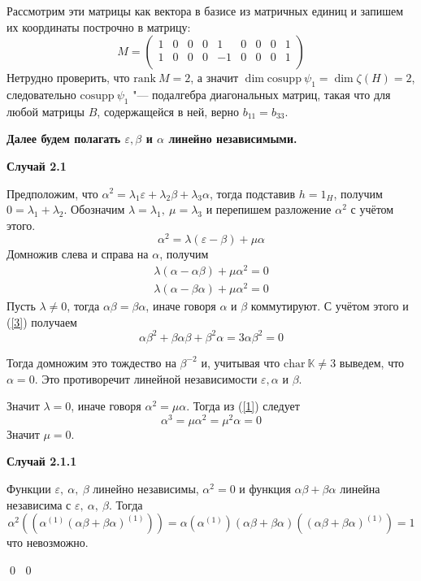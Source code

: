 \documentclass[12pt, reqno, a4paper, oneside, notitlepage]{amsart}
\makeatletter
\theoremstyle{mytheoremstyle}
\theoremstyle{myremarkstyle}
\numberwithin{equation}{section}
\renewenvironment{proof}[1][\proofname]{\par\indent {\bfseries #1\@addpunct{.} }}{\qed}
\makeatother
\begin{document}
\begin{proof}
\begin{proof}
    Рассмотрим эти матрицы как вектора в базисе из матричных единиц и запишем их координаты построчно в матрицу: \[
        M = \begin{pmatrix}
            1 & 0 & 0 & 0 & 1 & 0 & 0 & 0 & 1\\
            1 & 0 & 0 & 0 & -1 & 0 & 0 & 0 & 1\\
        \end{pmatrix}
    \]
    Нетрудно проверить, что $\mathrm{rank}\ M = 2$, а значит $\dim \mathrm{cosupp}\ \psi_1 = \dim \zeta(H) = 2$, следовательно $\mathrm{cosupp}\ \psi_1$ "--- подалгебра диагональных матриц, такая что для любой матрицы $B$, содержащейся в ней, верно $b_{11}=b_{33}$.
    
    \textbf{Далее будем полагать $\varepsilon, \beta$ и $\alpha$ линейно независимыми.}

    \textbf{Случай 2.1}
    
    \noindent Предположим, что $\alpha^2 = \lambda_1\varepsilon + \lambda_2\beta + \lambda_3 \alpha$, тогда подставив $h = 1_H$, получим $0 = \lambda_1+\lambda_2$. Обозначим $\lambda = \lambda_1,\ \mu = \lambda_3$ и перепишем разложение $\alpha^2$ с учётом этого.
    \[\alpha^2 = \lambda(\varepsilon - \beta) + \mu \alpha\]
    Домножив слева и справа на $\alpha$, получим 
    \begin{eqnarray*}
        \lambda(\alpha-\alpha\beta) + \mu\alpha^2 = 0\\
        \lambda(\alpha-\beta\alpha) + \mu\alpha^2 = 0
    \end{eqnarray*}
    Пусть $\lambda \neq 0$, тогда $\alpha\beta = \beta\alpha$, иначе говоря $\alpha$ и $\beta$ коммутируют. С учётом этого и  (\ref{3}) получаем
    \[
    \alpha\beta^2+\beta\alpha\beta+\beta^2\alpha = 3\alpha\beta^2 = 0
    \]

    Тогда домножим это тождество на $\beta^{-2}$ и, учитывая что $\mathrm{char}\ \mathbb{K} \neq 3$ выведем, что $\alpha = 0$. Это противоречит линейной независимости $\varepsilon, \alpha$ и $\beta$.

    Значит $\lambda = 0$, иначе говоря $\alpha^2 = \mu\alpha$. Тогда из (\ref{1}) следует 
    \[
    \alpha^3 = \mu\alpha^2 = \mu^2\alpha = 0
    \]
    Значит $\mu = 0$. 

    \textbf{Случай 2.1.1}

    Функции $\varepsilon,\ \alpha,\ \beta$ линейно независимы, $\alpha^2 =0$ и функция $\alpha\beta+\beta\alpha$ линейна независима с $\varepsilon,\ \alpha,\ \beta$.
    Тогда \[
    \alpha^2\left(\left(\alpha^{(1)}(\alpha\beta+\beta\alpha)^{(1)}\right)\right) = \alpha(\alpha^{(1)})(\alpha\beta+\beta\alpha)\left((\alpha\beta+\beta\alpha)^{(1)}\right) = 1
    \]
    что невозможно.


\end{proof}
\end{proof}
\end{document}
